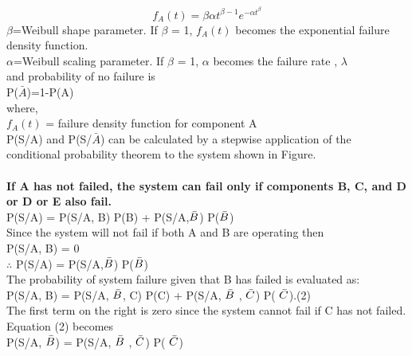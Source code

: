 \documentclass{article}
\begin{document}
\begin{itemize}
    $$f_{A}(t)=\beta \alpha t^{\beta-1} e^{-\alpha t^{\beta}}$$
    $\beta$=Weibull shape parameter. If $\beta$ = 1, $f_{A}(t)$ becomes the exponential failure density function.\\
    $\alpha$=Weibull scaling parameter. If $\beta$ = 1, $\alpha$ becomes the failure rate , $\lambda$ \\
    and probability of no failure is \\ \vspace{1mm}
    \hspace{15mm}P($\bar{A}$)=1-P(A) \\
    where,\\ \vspace{1mm}
    \hspace{15mm}$f_{A}(t)$ = failure density function for component A\\
    P(S/A) and P(S/$\bar{A}$) can be calculated by  a stepwise application of the conditional probability theorem to the system shown in Figure.\\ \\
    \textbf{If A has not failed, the system can fail only if components B, C, and D or D or E also fail.}\\\vspace{5mm}
    \hspace{15mm}P(S/A) = P(S/A, B) P(B) + P(S/A,$\Bar{B}$) P($\Bar{B}$) \\
    Since the system will not fail if both A and B are operating then \\\vspace{5mm}
\hspace{15mm}P(S/A, B) = 0 \\ \vspace{5mm}
\hspace{15mm}$\therefore$  P(S/A) =  P(S/A,$\Bar{B}$) P($\Bar{B}$) \\
The probability of system failure given that B has failed is evaluated
as:\\ \vspace{5mm}
\hspace{15mm}P(S/A, B) = P(S/A, $\Bar{B}$, C) P(C) + P(S/A, $\Bar{B}$ , $\Bar{C}$) P( $\Bar{C}$).\hspace{30mm}(2) \\ 
The first term on the right is zero since the system cannot fail if C
has not failed. Equation (2) becomes \\ \vspace{5mm}
\hspace{15mm}P(S/A, $\Bar{B}$) =  P(S/A, $\Bar{B}$ , $\Bar{C}$) P( $\Bar{C}$)\\

\end{itemize}
\end{document}

